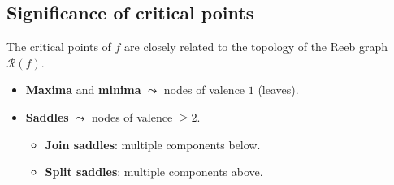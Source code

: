 \subsection*{Significance of critical points}
\begin{frame}[fragile]
The critical points of $f$ are closely related to the topology of the Reeb graph $\mathcal{R}(f)$.
\begin{itemize}
\item<2-> \textbf{Maxima} and \textbf{minima} $\leadsto$ nodes of valence $1$ (leaves).
\item<3-> \textbf{Saddles} $\leadsto$ nodes of valence $\ge 2$.\\
\begin{itemize}
\item \textbf{Join saddles}: multiple components below.
\item \textbf{Split saddles}: multiple components above.
\end{itemize}
\end{itemize}
\begin{center}
{}
\end{center}
\end{frame}
